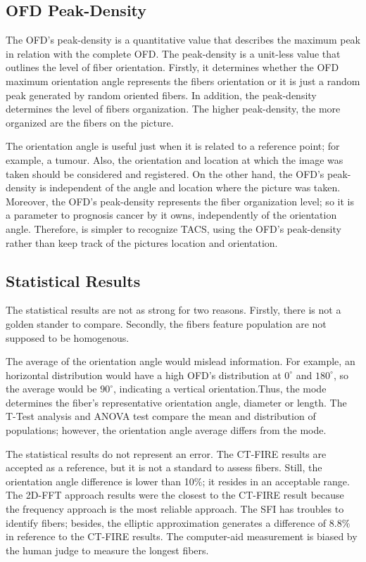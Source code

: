 \documentclass[12pt,a4paper]{article}
\begin{document}
\subsection{OFD Peak-Density}

The OFD's peak-density is a quantitative value that describes the maximum peak in relation with the complete OFD. The peak-density is a unit-less value that outlines the level of fiber orientation. Firstly, it determines whether the  OFD maximum orientation angle represents the fibers orientation or it is just a random peak generated by random oriented fibers. In addition, the peak-density determines the level of fibers organization. The higher peak-density, the more organized are the fibers on the picture. 
 
The orientation angle is useful just when it is related to a reference point; for example, a tumour. Also, the orientation and location at which the image was taken should be considered and registered. On the other hand, the OFD's peak-density is independent of the angle and location where the picture was taken. Moreover, the OFD's peak-density represents the fiber organization level; so it is a parameter to prognosis cancer by it owns, independently of the orientation angle. Therefore, is simpler to recognize TACS, using the OFD's peak-density rather than keep track of the pictures location and orientation. 

\subsection{Statistical Results}

The statistical results are not as strong for two reasons. Firstly, there is not a golden stander to compare. Secondly, the fibers feature population are not supposed to be homogenous. 

 The average of the orientation angle would mislead information. For example, an horizontal distribution would have a high OFD's distribution at $0^{\circ}$ and $180^{\circ}$, so the average would be $90^{\circ}$, indicating a vertical orientation.Thus,   the mode determines the fiber's representative orientation angle, diameter or length. The T-Test analysis and ANOVA test compare the mean and distribution of populations; however, the orientation angle average differs from the mode. 
 
The statistical results do not represent an error. The CT-FIRE results are accepted as a reference, but it is not a standard to assess fibers. Still, the orientation angle difference is lower than 10\%; it resides in an acceptable range. The 2D-FFT approach results were the closest to the CT-FIRE result because the frequency approach is the most reliable approach. The SFI has troubles to identify fibers; besides, the elliptic approximation generates a difference of 8.8\% in reference to the CT-FIRE results. The computer-aid measurement is biased by the human judge to measure the longest fibers. 
 
\end{document}
